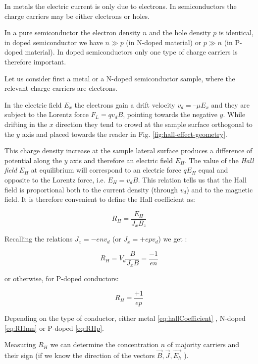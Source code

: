 \documentclass[]{book}
\begin{document}
In metals the electric current is only due to electrons. In
semiconductors the charge carriers may be either electrons or holes.

In a pure semiconductor the electron density \(n\) and the hole density
\(p\) is identical, in doped semiconductor we have \(n\gg p\) (in
N-doped material) or \(p\gg n\) (in P-doped material). In doped
semiconductors only one type of charge carriers is therefore important.

Let us consider first a metal or a N-doped semiconductor sample, where
the relevant charge carriers are electrons.

In the electric field \(E_x\) the electrons gain a drift velocity
\(v_d=–\mu E_x\) and they are subject to the Lorentz force
\(F_L=qv_dB\), pointing towards the negative \(y\). While drifting in
the \(x\) direction they tend to crowd at the sample surface orthogonal
to the \(y\) axis and placed towards the reader in Fig.
\ref{fig:hall-effect-geometry}.

This charge density increase at the sample lateral surface produces a
difference of potential along the \(y\) axis and therefore an electric
field \(E_H\). The value of the \emph{Hall field} \(E_H\) at equilibrium
will correspond to an electric force \(qE_H\) equal and opposite to the
Lorentz force, i.e. \(E_H=v_d B\). This relation tells us that the Hall
field is proportional both to the current density (through \(v_d\)) and
to the magnetic field. It is therefore convenient to define the Hall
coefficient as:

\begin{equation}
R_H=\frac{E_H}{J_x B_z}
\label{eq:hallCoefficient}
\end{equation}

Recalling the relations \(J_x=-env_d\) (or \(J_x=+epv_d\)) we get :

\begin{equation}
R_{ H }=V_{ d }\frac { B }{ J_{ x }B } =\frac { -1 }{ en } 
\label{eq:RHmn}
\end{equation}

or otherwise, for P-doped conductors:

\begin{equation}
 R_{ H }=\frac { +1 }{ ep }
\label{eq:RHp}
\end{equation}

Depending on the type of conductor, either metal
\eqref{eq:hallCoefficient} , N-doped \eqref{eq:RHmn} or P-doped
\eqref{eq:RHp}.

Measuring \(R_H\) we can determine the concentration \(n\) of majority
carriers and their sign (if we know the direction of the vectors
\(\vec { B } ,\vec { J } ,\vec { E_{ h } }\) ).
\end{document}
